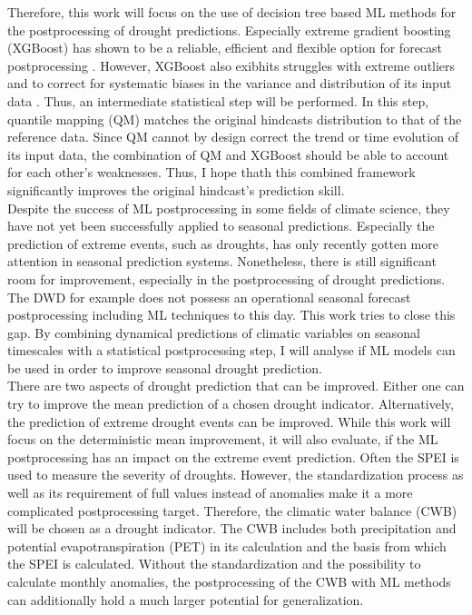 \documentclass[ba-lentz.tex]{subfile}
\begin{document}
Therefore, this work will focus on the use of decision tree based ML methods for the postprocessing of drought predictions.
Especially extreme gradient boosting (XGBoost) has shown to be a reliable, efficient and flexible option for forecast postprocessing \parencite{feng_bias_2024}.
However, XGBoost also exibhits struggles with extreme outliers and to correct for systematic biases in the variance and distribution of its input data \parencite{feng_bias_2024}.
Thus, an intermediate statistical step will be performed.
In this step, quantile mapping (QM) matches the original hindcasts distribution to that of the reference data.
Since QM cannot by design correct the trend or time evolution of its input data, the combination of QM and XGBoost should be able to account for each other's weaknesses.
Thus, I hope thath this combined framework significantly improves the original hindcast's prediction skill.\\
Despite the success of ML postprocessing in some fields of climate science, they have not yet been successfully applied to seasonal predictions.
Especially the prediction of extreme events, such as droughts, has only recently gotten more attention in seasonal prediction systems.
Nonetheless, there is still significant room for improvement, especially in the postprocessing of drought predictions.
The DWD for example does not possess an operational seasonal forecast postprocessing including ML techniques to this day.
This work tries to close this gap.
By combining dynamical predictions of climatic variables on seasonal timescales with a statistical postprocessing step, I will analyse if ML models can be used in order to improve seasonal drought prediction. \\
There are two aspects of drought prediction that can be improved.
Either one can try to improve the mean prediction of a chosen drought indicator.
Alternatively, the prediction of extreme drought events can be improved.
While this work will focus on the deterministic mean improvement, it will also evaluate, if the ML postprocessing has an impact on the extreme event prediction.
Often the SPEI is used to measure the severity of droughts.
However, the standardization process as well as its requirement of full values instead of anomalies make it a more complicated postprocessing target.
Therefore, the climatic water balance (CWB) will be chosen as a drought indicator.
The CWB includes both precipitation and potential evapotranspiration (PET) in its calculation and the basis from which the SPEI is calculated.
Without the standardization and the possibility to calculate monthly anomalies, the postprocessing of the CWB with ML methods can additionally hold a much larger potential for generalization.
\end{document}
